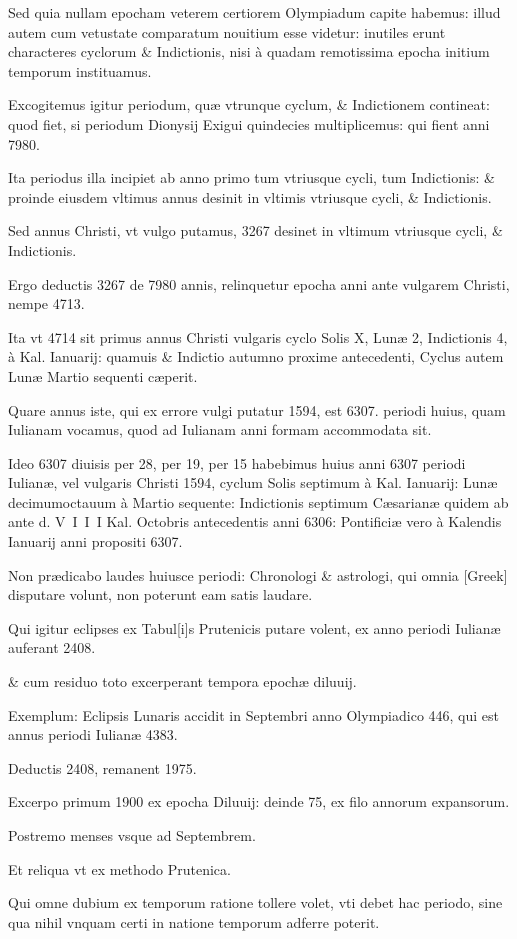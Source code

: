 \begin{parnumbers}

Sed quia nullam epocham veterem certiorem Olympiadum capite habemus: illud autem  cum vetustate comparatum nouitium esse videtur: inutiles erunt characteres cyclorum \& Indictionis, nisi à quadam remotissima epocha initium temporum instituamus.

Excogitemus igitur periodum, quæ vtrunque cyclum, \& Indictionem contineat: quod fiet, si periodum Dionysij Exigui quindecies multiplicemus: qui fient anni 7980.

Ita periodus illa incipiet ab anno primo tum vtriusque cycli, tum Indictionis: \& proinde eiusdem vltimus annus desinit in vltimis vtriusque cycli, \& Indictionis.

Sed annus Christi, vt vulgo putamus, 3267 desinet in vltimum vtriusque cycli, \& Indictionis.

Ergo deductis 3267 de 7980 annis, relinquetur epocha anni ante vulgarem  Christi, nempe 4713.

Ita vt 4714 sit primus annus Christi vulgaris cyclo Solis X, Lunæ 2, Indictionis 4, à Kal. Ianuarij: quamuis \& Indictio autumno proxime antecedenti, Cyclus autem Lunæ Martio sequenti cæperit.

Quare annus iste, qui ex errore vulgi putatur 1594, est 6307. periodi huius, quam Iulianam vocamus, quod ad Iulianam anni formam accommodata sit.

Ideo 6307 diuisis per 28, per 19, per 15 habebimus huius anni 6307 periodi Iulianæ, vel vulgaris Christi 1594, cyclum Solis septimum à Kal. Ianuarij: Lunæ decimumoctauum à Martio sequente: Indictionis septimum Cæsarianæ quidem ab ante d. V I I I Kal. Octobris antecedentis anni 6306: Pontificiæ vero à  Kalendis Ianuarij anni propositi 6307.

Non prædicabo laudes huiusce periodi: Chronologi \& astrologi, qui omnia \textgreek{[Greek]} disputare volunt, non poterunt eam satis laudare.

Qui igitur eclipses ex Tabul[i]s Prutenicis putare volent, ex anno periodi Iulianæ auferant 2408.

\& cum residuo toto excerperant tempora epochæ diluuij.

Exemplum: Eclipsis Lunaris accidit in Septembri anno Olympiadico 446, qui est annus periodi Iulianæ 4383.

Deductis 2408, remanent 1975.

Excerpo primum 1900 ex epocha Diluuij: deinde 75, ex filo annorum expansorum.

Postremo menses vsque ad Septembrem.

Et reliqua vt ex methodo Prutenica.

Qui omne dubium ex temporum ratione tollere volet, vti debet hac periodo, sine qua nihil vnquam certi in natione  temporum adferre poterit.

\end{parnumbers}
